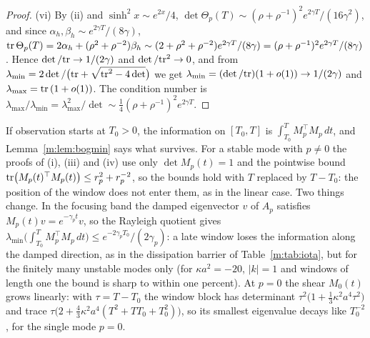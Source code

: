 \begin{proof}
(vi) By (ii) and $\sinh^2x\sim e^{2x}/4$, $\det\Theta_p(T)\sim(\rho+\rho^{-1})^2e^{2\gamma T}/(16\gamma^2)$, and since $\alpha_h,\beta_h\sim e^{2\gamma T}/(8\gamma)$, $\mathrm{tr}\,\Theta_p(T)=2\alpha_h+(\rho^2+\rho^{-2})\beta_h\sim(2+\rho^2+\rho^{-2})e^{2\gamma T}/(8\gamma)=(\rho+\rho^{-1})^2e^{2\gamma T}/(8\gamma)$. Hence $\det/\mathrm{tr}\to1/(2\gamma)$ and $\det/\mathrm{tr}^2\to0$, and from $\lambda_{\min}=2\det/\big(\mathrm{tr}+\sqrt{\mathrm{tr}^2-4\det}\big)$ we get $\lambda_{\min}=(\det/\mathrm{tr})(1+o(1))\to1/(2\gamma)$ and $\lambda_{\max}=\mathrm{tr}\,(1+o(1))$. The condition number is $\lambda_{\max}/\lambda_{\min}=\lambda_{\max}^2/\det\sim\frac14(\rho+\rho^{-1})^2e^{2\gamma T}$.
\end{proof}

If observation starts at $T_0>0$, the information on $[T_0,T]$ is $\int_{T_0}^TM_p^\top M_p\,dt$, and Lemma~\ref{m:lem:bogmin} says what survives. For a stable mode with $p\ne0$ the proofs of (i), (iii) and (iv) use only $\det M_p(t)=1$ and the pointwise bound $\mathrm{tr}\big(M_p(t)^\top M_p(t)\big)\le r_p^2+r_p^{-2}$, so the bounds hold with $T$ replaced by $T-T_0$: the position of the window does not enter them, as in the linear case. Two things change. In the focusing band the damped eigenvector $v$ of $A_p$ satisfies $M_p(t)v=e^{-\gamma_pt}v$, so the Rayleigh quotient gives $\lambda_{\min}\big(\int_{T_0}^TM_p^\top M_p\,dt\big)\le e^{-2\gamma_pT_0}/(2\gamma_p)$: a late window loses the information along the damped direction, as in the dissipation barrier of Table~\ref{m:tab:iota}, but for the finitely many unstable modes only (for $\kappa a^2=-20$, $|k|=1$ and windows of length one the bound is sharp to within one percent). At $p=0$ the shear $M_0(t)$ grows linearly: with $\tau=T-T_0$ the window block has determinant $\tau^2\big(1+\tfrac13\kappa^2a^4\tau^2\big)$ and trace $\tau\big(2+\tfrac43\kappa^2a^4(T^2+TT_0+T_0^2)\big)$, so its smallest eigenvalue decays like $T_0^{-2}$, for the single mode $p=0$.


